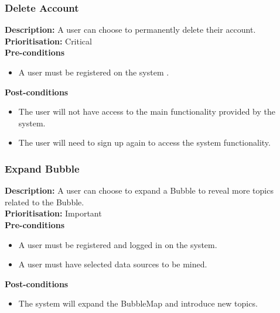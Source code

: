 \documentclass[hidelinks,english]{article}
\begin{document}
    		\subsubsection{Delete Account}
				\textbf{Description:}  A user can choose to permanently delete their account.\\
    			\textbf{Prioritisation:} Critical\\
      			\textbf{Pre-conditions}
    			\begin{itemize}
        			\item A user must be registered on the system .
    			\end{itemize}
    			\textbf{Post-conditions}
     			\begin{itemize}
        			\item The user will not have access to the main functionality provided by the system.
        			\item The user will need to sign up again to access the system functionality.
    			\end{itemize}
		    \subsubsection{Expand Bubble}
				\textbf{Description:}  A user can choose to expand a Bubble to reveal more topics related to the Bubble.\\
			    \textbf{Prioritisation:} Important\\
      			\textbf{Pre-conditions}
			    \begin{itemize}
			        \item A user must be registered and logged in on the system.
			        \item A user must have selected data sources to be mined.
			    \end{itemize}
			    \textbf{Post-conditions}
			     \begin{itemize}
			        \item The system will expand the BubbleMap and introduce new topics.
			    \end{itemize}
\end{document}
